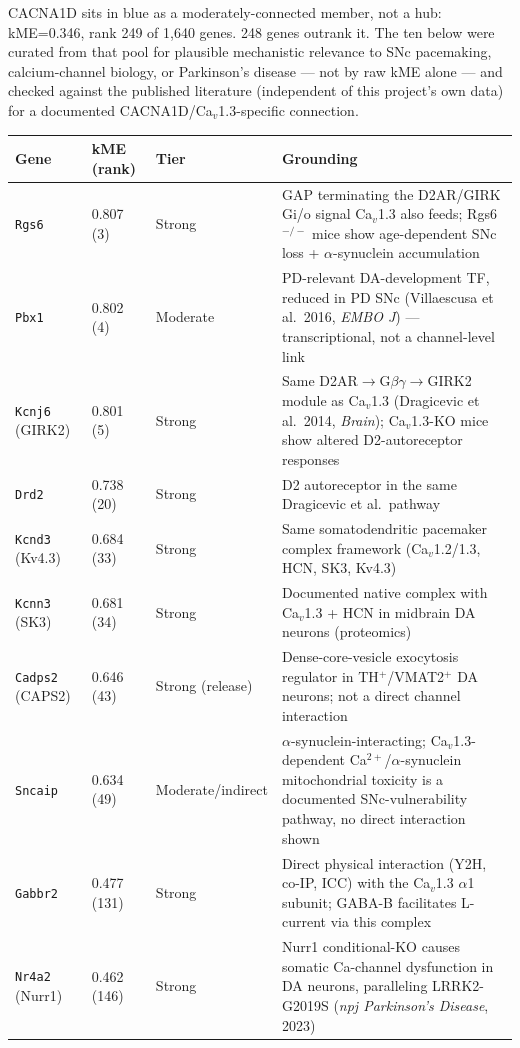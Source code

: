 \documentclass[11pt]{article}
\begin{document}
CACNA1D sits in blue as a moderately-connected member, not a hub: kME=0.346,
rank 249 of 1{,}640 genes. 248 genes outrank it. The ten below were curated
from that pool for plausible mechanistic relevance to SNc pacemaking,
calcium-channel biology, or Parkinson's disease --- not by raw kME alone ---
and checked against the published literature (independent of this project's
own data) for a documented CACNA1D/Ca$_v$1.3-specific connection.

\begin{table}[h]
\centering
\begin{tabular}{llll}
\toprule
Gene & kME (rank) & Tier & Grounding \\
\midrule
\texttt{Rgs6} & 0.807 (3) & Strong & GAP terminating the D2AR/GIRK Gi/o signal Ca$_v$1.3 also feeds; Rgs6$^{-/-}$ mice show age-dependent SNc loss + $\alpha$-synuclein accumulation \\
\texttt{Pbx1} & 0.802 (4) & Moderate & PD-relevant DA-development TF, reduced in PD SNc (Villaescusa et al.\ 2016, \emph{EMBO J}) --- transcriptional, not a channel-level link \\
\texttt{Kcnj6} (GIRK2) & 0.801 (5) & Strong & Same D2AR$\to$G$\beta\gamma\to$GIRK2 module as Ca$_v$1.3 (Dragicevic et al.\ 2014, \emph{Brain}); Ca$_v$1.3-KO mice show altered D2-autoreceptor responses \\
\texttt{Drd2} & 0.738 (20) & Strong & D2 autoreceptor in the same Dragicevic et al.\ pathway \\
\texttt{Kcnd3} (Kv4.3) & 0.684 (33) & Strong & Same somatodendritic pacemaker complex framework (Ca$_v$1.2/1.3, HCN, SK3, Kv4.3) \\
\texttt{Kcnn3} (SK3) & 0.681 (34) & Strong & Documented native complex with Ca$_v$1.3 + HCN in midbrain DA neurons (proteomics) \\
\texttt{Cadps2} (CAPS2) & 0.646 (43) & Strong (release) & Dense-core-vesicle exocytosis regulator in TH$^+$/VMAT2$^+$ DA neurons; not a direct channel interaction \\
\texttt{Sncaip} & 0.634 (49) & Moderate/indirect & $\alpha$-synuclein-interacting; Ca$_v$1.3-dependent Ca$^{2+}$/$\alpha$-synuclein mitochondrial toxicity is a documented SNc-vulnerability pathway, no direct interaction shown \\
\texttt{Gabbr2} & 0.477 (131) & Strong & Direct physical interaction (Y2H, co-IP, ICC) with the Ca$_v$1.3 $\alpha$1 subunit; GABA-B facilitates L-current via this complex \\
\texttt{Nr4a2} (Nurr1) & 0.462 (146) & Strong & Nurr1 conditional-KO causes somatic Ca-channel dysfunction in DA neurons, paralleling LRRK2-G2019S (\emph{npj Parkinson's Disease}, 2023) \\
\bottomrule
\end{tabular}
\end{table}
\end{document}

